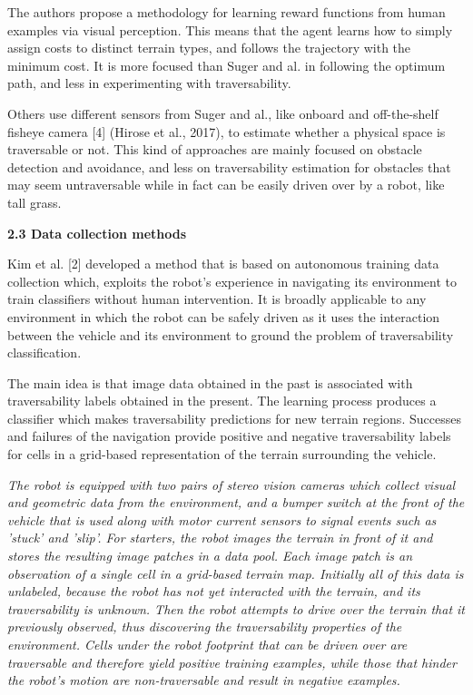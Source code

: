 \documentclass[12pt,a4paper]{article}
\begin{document}
	The authors propose a methodology for learning reward functions from 
	human examples via visual perception. This means that the agent learns 
	how to simply assign costs to distinct terrain types, and follows the 
	trajectory with the minimum cost. It is more focused than Suger and al. in 
	following the optimum path, and less in experimenting with traversability.
	\newline
	
	Others use different sensors from Suger and al., like onboard and off-the-shelf 
	fisheye camera [4] (Hirose et al., 2017), to estimate whether a physical space 
	is traversable or not. This kind of approaches are mainly focused on obstacle 
	detection and avoidance, and less on traversability estimation for obstacles 
	that may seem untraversable while in fact can be easily driven over by a 
	robot, like tall grass.
	\newline\newline
	
	\large\textbf{2.3 Data collection methods}
	\normalsize\newline
	
	Kim et al. [2] developed a method 
	that is based on autonomous training data collection which, exploits the 
	robot’s experience in navigating its environment to train classifiers without 
	human intervention. It is broadly applicable to any environment in which 
	the robot can be safely driven as it uses the interaction between the vehicle
	and its environment to ground the problem of traversability classification.
	
	The main idea is that image data  obtained in the past is associated with 
	traversability labels obtained in the  present. The learning process produces a 
	classifier which makes traversability  predictions for new terrain regions. 
	Successes and failures of the navigation provide positive and negative 
	traversability labels for cells in a grid-based representation of the terrain surrounding 
	the vehicle.
	
	\textit{The robot is equipped with two pairs of stereo vision cameras which 
	collect visual and geometric data from the environment, and a bumper switch
	at the front of the vehicle that is used along with motor current sensors to 
	signal events such as ’stuck’ and ’slip’.
	\newline
	For starters, the robot images the terrain in front of it and stores the 
	resulting image patches in a data pool. Each image patch is an observation 
	of a single cell in a grid-based terrain map. Initially all of this data is 
	unlabeled, because the robot has not yet interacted with the terrain, and its 
	traversability is unknown. 
	\newline
	Then the robot attempts to drive over the terrain that it previously 
	observed, thus discovering the traversability properties of the environment. 
	Cells under the robot footprint that can be driven over are traversable and 
	therefore yield positive training examples, while those that hinder the robot’s 
	motion are non-traversable	and result in negative examples.}
	
\end{document}
